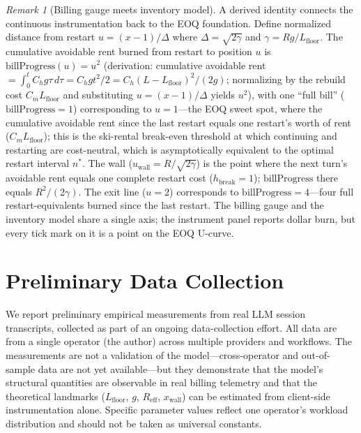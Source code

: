 \documentclass[11pt]{article}
\theoremstyle{definition}
\theoremstyle{remark}
\newtheorem{remark}[theorem]{Remark}
\begin{document}
\begin{remark}[Billing gauge meets inventory model]
A derived identity connects the continuous instrumentation back to the EOQ foundation. Define normalized distance from restart $u = (x-1)/\Delta$ where $\Delta = \sqrt{2\gamma}$ and $\gamma = R g / L_{\text{floor}}$. The cumulative avoidable rent burned from restart to position $u$ is $\text{billProgress}(u) = u^2$ (derivation: cumulative avoidable rent $= \int_0^t C_h g \tau \,d\tau = C_h g t^2/2 = C_h (L-L_{\text{floor}})^2/(2g)$; normalizing by the rebuild cost $C_m L_{\text{floor}}$ and substituting $u = (x-1)/\Delta$ yields $u^2$), with one ``full bill'' ($\text{billProgress}=1$) corresponding to $u=1$---the EOQ sweet spot, where the cumulative avoidable rent since the last restart equals one restart's worth of rent ($C_m L_{\text{floor}}$); this is the ski-rental break-even threshold at which continuing and restarting are cost-neutral, which is asymptotically equivalent to the optimal restart interval $n^*$. The wall ($u_{\text{wall}} = R/\sqrt{2\gamma}$) is the point where the next turn's avoidable rent equals one complete restart cost ($h_{\text{break}} = 1$); $\text{billProgress}$ there equals $R^2/(2\gamma)$. The exit line ($u=2$) corresponds to $\text{billProgress}=4$---four full restart-equivalents burned since the last restart. The billing gauge and the inventory model share a single axis; the instrument panel reports dollar burn, but every tick mark on it is a point on the EOQ U-curve.
\end{remark}

\section{Preliminary Data Collection}

We report preliminary empirical measurements from real LLM session transcripts, collected as part of an ongoing data-collection effort. All data are from a single operator (the author) across multiple providers and workflows. The measurements are not a validation of the model---cross-operator and out-of-sample data are not yet available---but they demonstrate that the model's structural quantities are observable in real billing telemetry and that the theoretical landmarks ($L_{\text{floor}}$, $g$, $R_{\text{eff}}$, $x_{\text{wall}}$) can be estimated from client-side instrumentation alone. Specific parameter values reflect one operator's workload distribution and should not be taken as universal constants.
\end{document}
